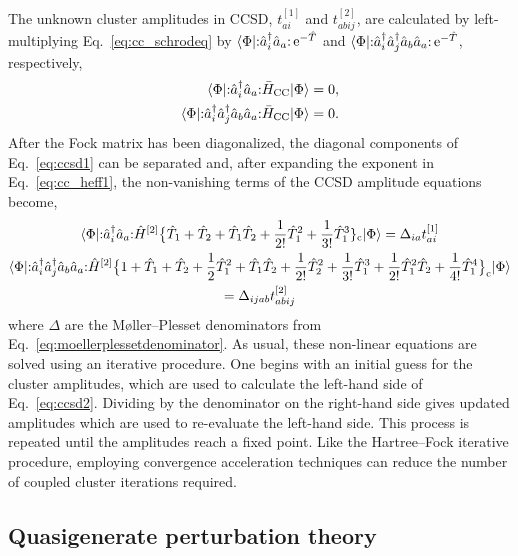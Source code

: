 The unknown cluster amplitudes in CCSD, $t_{a i}^{[1]}$ and $t_{a b i j}^{[2]}$, are calculated by left-multiplying Eq.\ \eqref{eq:cc_schrodeq} by $\langle \Phi | \mathopen: \hat a_i^\dagger \hat a_a \mathclose: \operatorname{e}^{-\hat{T}}$ and $\langle \Phi | \mathopen: \hat a_i^\dagger \hat a_j^\dagger \hat a_b \hat a_a \mathclose: \operatorname{e}^{-\hat{T}}$, respectively,
\begin{align} \label{eq:ccsd1}
  \langle \Phi | \mathopen: \hat a_i^\dagger \hat a_a \mathclose: \bar{H}_{\mathrm{CC}} | \Phi \rangle &= 0, \\
  \langle \Phi | \mathopen: \hat a_i^\dagger \hat a_j^\dagger \hat a_b \hat a_a \mathclose:\bar{H}_{\mathrm{CC}} | \Phi \rangle &= 0. \notag
\end{align}
After the Fock matrix has been diagonalized, the diagonal components of Eq.\ \eqref{eq:ccsd1} can be separated and, after expanding the exponent in Eq.\ \eqref{eq:cc_heff1}, the non-vanishing terms of the CCSD amplitude equations become,
\begin{gather} \label{eq:ccsd2}
  \langle \Phi | \mathopen: \hat a_i^\dagger \hat a_a \mathclose: \hat{H}^{[2]} \bigl\{\hat{T}_1 + \hat{T}_2 + \hat{T}_1\hat{T}_2 + \frac{1}{2!} \hat{T}_1^{2} + \frac{1}{3!} \hat{T}_1^{3}\}_{\mathrm{c}} | \Phi \rangle = \Delta_{i a} t_{a i}^{[1]} \\
  \langle \Phi | \mathopen: \hat a_i^\dagger \hat a_j^\dagger \hat a_b \hat a_a \mathclose: \hat{H}^{[2]} \bigl\{1 + \hat{T}_1 + \hat{T}_2 + \frac{1}{2} \hat{T}_1^{2} + \hat{T}_1\hat{T}_2 + \frac{1}{2!} \hat{T}_2^{2} + \frac{1}{3!} \hat{T}_1^{3} + \frac{1}{2!} \hat{T}_1^{2} \hat{T}_2 + \frac{1}{4!} \hat{T}_1^{4}\bigr\}_{\mathrm{c}} | \Phi \rangle \notag \\
= \Delta_{i j a b} t_{a b i j}^{[2]} \notag
\end{gather}
where $\Delta$ are the M\o ller--Plesset denominators from Eq.\ \eqref{eq:moellerplessetdenominator}.  As usual, these non-linear equations are solved using an iterative procedure.  One begins with an initial guess for the cluster amplitudes, which are used to calculate the left-hand side of Eq.\ \eqref{eq:ccsd2}.  Dividing by the denominator on the right-hand side gives updated amplitudes which are used to re-evaluate the left-hand side. This process is repeated until the amplitudes reach a fixed point.  Like the Hartree--Fock iterative procedure, employing convergence acceleration techniques can reduce the number of coupled cluster iterations required.

\subsection{Quasigenerate perturbation theory}
\label{subsec:selfenergy}


